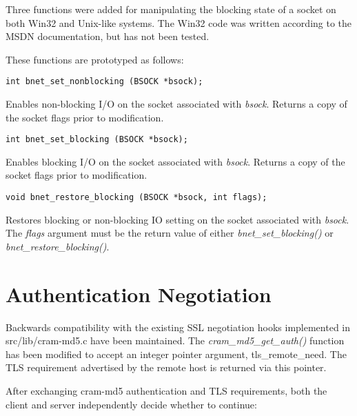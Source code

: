 Three functions were added for manipulating the blocking state of a socket
on both Win32 and Unix-like systems.  The Win32 code was written according
to the MSDN documentation, but has not been tested.

These functions are prototyped as follows:

\footnotesize
\begin{verbatim}
int bnet_set_nonblocking (BSOCK *bsock);
\end{verbatim}
\normalsize

Enables non-blocking I/O on the socket associated with \emph{bsock}.
Returns a copy of the socket flags prior to modification.

\footnotesize
\begin{verbatim}
int bnet_set_blocking (BSOCK *bsock);
\end{verbatim}
\normalsize

Enables blocking I/O on the socket associated with \emph{bsock}.  Returns a
copy of the socket flags prior to modification.

\footnotesize
\begin{verbatim}
void bnet_restore_blocking (BSOCK *bsock, int flags);
\end{verbatim}
\normalsize

Restores blocking or non-blocking IO setting on the socket associated with
\emph{bsock}.  The \emph{flags} argument must be the return value of either
\emph{bnet\_set\_blocking()} or \emph{bnet\_restore\_blocking()}.

\pagebreak

\section{Authentication Negotiation}

Backwards compatibility with the existing SSL negotiation hooks implemented
in src/lib/cram-md5.c have been maintained.  The
\emph{cram\_md5\_get\_auth()} function has been modified to accept an
integer pointer argument, tls\_remote\_need.  The TLS requirement
advertised by the remote host is returned via this pointer.

After exchanging cram-md5 authentication and TLS requirements, both the
client and server independently decide whether to continue:

